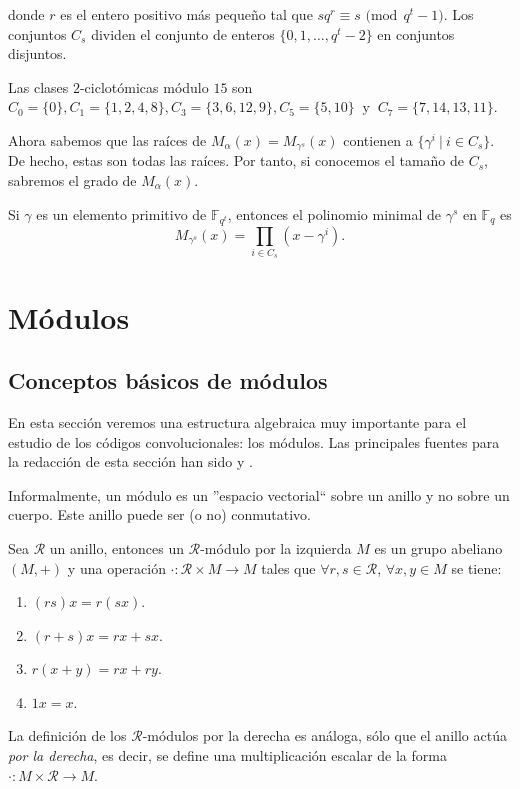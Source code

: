  donde $r$ es el entero positivo más pequeño tal que $sq^r \equiv s \text{  (mod} \ \ q^t - 1)$. Los conjuntos $C_s$ dividen el conjunto de enteros $\{0,1,\dots,q^t-2\}$ en conjuntos disjuntos.

 \begin{ejemplo}
Las clases $2$-ciclotómicas módulo $15$ son $C_0 = \{0\},C_1 = \{1,2,4,8\}, C_3 = \{3,6,12,9\}, C_5 = \{5,10\} \ \text{ y } \ C_7 = \{7,14,13,11\}$.
 \end{ejemplo}

Ahora sabemos que las raíces de $M_\alpha(x) = M_{\gamma^s}(x)$ contienen a $\{\gamma^i \ | \ i \in C_s\}$. De hecho, estas son todas las raíces. Por tanto, si conocemos el tamaño de $C_s$, sabremos el grado de $M_\alpha(x)$.

\begin{teorema}\label{th:1.ult}
    Si $\gamma$ es un elemento primitivo de $\mathbb{F}_{q^t}$, entonces el polinomio minimal de $\gamma^s$ en $\mathbb{F}_q$ es $$ M_{\gamma^s}(x) = \prod_{i \in C_s} (x - \gamma^i). $$
\end{teorema}

\section{Módulos}

\subsection{Conceptos básicos de módulos}

En esta sección veremos una estructura algebraica muy importante para el estudio de los códigos convolucionales: los módulos. Las principales fuentes para la redacción de esta sección han sido \cite{wisbauer1991foundations} y \cite{cccheide}.

Informalmente, un módulo es un ”espacio vectorial“  sobre un anillo y no sobre un cuerpo. Este anillo puede ser (o no) conmutativo.

\begin{definicion}
Sea $\mathcal{R}$ un anillo, entonces un $\mathcal{R}$-módulo por la izquierda $M$ es un grupo abeliano $(M,+)$ y una operación $\cdot : \mathcal{R} \times M \rightarrow M$ tales que $\forall r,s \in \mathcal{R}$, $\forall x,y \in  M$ se tiene:
\begin{enumerate}
    \item $(rs)x = r(sx)$.
    \item $(r + s)x = rx + sx$.
    \item $r(x + y) = rx + ry$.
    \item $1x = x$.
\end{enumerate}

La definición de los $\mathcal{R}$-módulos por la derecha es análoga, sólo que el anillo actúa \emph{por la derecha}, es decir, se define una multiplicación escalar de la forma $\cdot :  M \times \mathcal{R}  \rightarrow M$.
\end{definicion}

